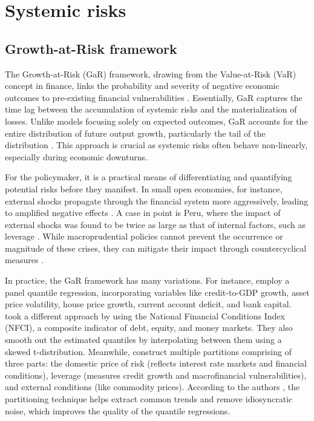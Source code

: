 \section{Systemic risks}
\subsection{Growth-at-Risk framework}
The Growth-at-Risk (GaR) framework, drawing from the Value-at-Risk (VaR) concept in finance, links the probability and severity of negative economic outcomes to pre-existing financial vulnerabilities \citep{imf_gar_2019}. Essentially, GaR captures the time lag between the accumulation of systemic risks and the materialization of losses. Unlike models focusing solely on expected outcomes, GaR accounts for the entire distribution of future output growth, particularly the tail of the distribution \citep{szabo2020}. This approach is crucial as systemic risks often behave non-linearly, especially during economic downturns.

For the policymaker, it is a practical means of differentiating and quantifying potential risks before they manifest. In small open economies, for instance, external shocks propagate through the financial system more aggressively, leading to amplified negative effects \citep{esrb2021}. A case in point is Peru, where the impact of external shocks was found to be twice as large as that of internal factors, such as leverage \citep{imf_gar_2019}. While macroprudential policies cannot prevent the occurrence or magnitude of these crises, they can mitigate their impact through countercyclical measures \citep{esrb2021}.

In practice, the GaR framework has many variations. For instance, \citet{aikman2019} employ a panel quantile regression, incorporating variables like credit-to-GDP growth, asset price volatility, house price growth, current account deficit, and bank capital. \citet{adrian_2019} took a different approach by using the National Financial Conditions Index (NFCI), a composite indicator of debt, equity, and money markets. They also smooth out the estimated quantiles by interpolating between them using a skewed t-distribution. Meanwhile, \citet{imf_gar_2019} construct multiple partitions comprising of three parts: the domestic price of risk (reflects interest rate markets and financial conditions), leverage (measures credit growth and macrofinancial vulnerabilities), and external conditions (like commodity prices). According to the authors \citep{imf_gar_2019}, the partitioning technique helps extract common trends and remove idiosyncratic noise, which improves the quality of the quantile regressions.


